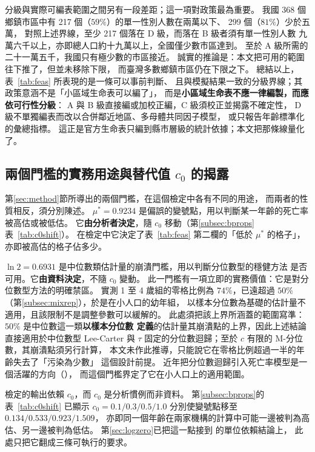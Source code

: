 \documentclass[UTF8, fontset=macnew, a4paper, 12pt]{ctexart}
\begin{document}
分級與實際可編表範圍之間另有一段差距；這一項對政策最為重要。
我國 368 個鄉鎮市區中有 217 個（$59\%$）的單一性別人數在兩萬以下、
299 個（$81\%$）少於五萬，
對照上述界線，至少 217 個落在 D 級，而落在 B 級者須有單一性別人數
九萬六千以上，亦即總人口約十九萬以上，全國僅少數市區達到。
至於 A 級所需的二十一萬五千，我國只有極少數的市區接近。
誠實的推論是：本文把可用的範圍往下推了，但並未移除下限，
而臺灣多數鄉鎮市區仍在下限之下。
總結以上，表~\ref{tab:feas} 所表現的是一條可以事前判斷、
且與模擬結果一致的分級界線；其政策意涵不是「小區域生命表可以編了」，
而是\textbf{小區域生命表不應一律編製，而應依可行性分級}：
A 與 B 級直接編或加校正編，C 級須校正並揭露不確定性，
D 級不單獨編表而改以合併鄰近地區、多母體共同因子模型，
或只報告年齡標準化的彙總指標。
這正是官方生命表只編到縣市層級的統計依據；本文把那條線量化了。

\subsection{兩個門檻的實務用途與替代值 $c_0$ 的揭露}\label{subsec:thresholds}\label{subsec:c0disc}

第\ref{sec:method}節所導出的兩個門檻，在這個檢定中各有不同的用途，
而兩者的性質相反，須分別陳述。
$\mu^{\ast}=0.9234$ 是偏誤的變號點，用以判斷某一年齡的死亡率被高估或被低估。
它\textbf{由分析者決定}，隨 $c_0$ 移動（第\ref{subsec:bprops}表~\ref{tab:c0shift}）。
在檢定中它決定了表~\ref{tab:feas} 第二欄的「低於 $\mu^{\ast}$ 的格子」，
亦即被高估的格子佔多少。

$\ln2=0.6931$ 是中位數類估計量的崩潰門檻，用以判斷分位數型的穩健方法
是否可用。它\textbf{由資料決定}，不隨 $c_0$ 變動。
此一門檻有一項立即的實務價值：它是對分位數型方法的明確禁區。
實測 1 至 4 歲組的零格比例為 $74\%$，已遠超過 $50\%$
（第\ref{subsec:mixrep}），於是在小人口的幼年組，
以樣本分位數為基礎的估計量不適用，且該限制不是調整參數可以緩解的。
此處須把該上界所涵蓋的範圍寫準：$50\%$ 是中位數這一類\textbf{以樣本分位數
定義}的估計量其崩潰點的上界，因此上述結論直接適用於中位數型 Lee-Carter 與
$\tau$ 固定的分位數迴歸；至於 $c$ 有限的 M-分位數，其崩潰點須另行計算，
本文未作此推導，只能說它在零格比例超過一半的年齡失去了「污染為少數」
這個設計前提。
近年把分位數迴歸引入死亡率模型是一個活躍的方向（\citealp{santolino2020}），
而這個門檻界定了它在小人口上的適用範圍。


檢定的輸出依賴 $c_0$，而 $c_0$ 是分析慣例而非資料。
第\ref{subsec:bprops}的表~\ref{tab:c0shift} 已顯示
$c_0=0.1/0.3/0.5/1.0$ 分別使變號點移至 $0.134/0.533/0.923/1.509$，
亦即同一個年齡在兩家機構的計算中可能一邊被判為高估、另一邊被判為低估。
第\ref{sec:logzero}已把這一點接到 \citet{chenroth2024} 的單位依賴結論上，
此處只把它翻成三條可執行的要求。
\end{document}
